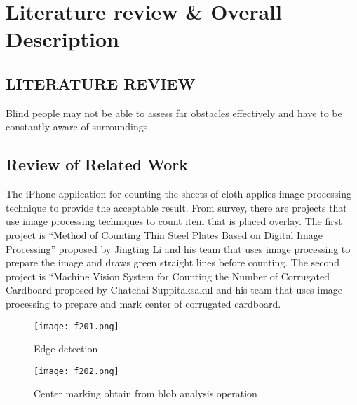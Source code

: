 
\chapter{Literature review & Overall Description} %

\label{Chapter2} %



\section{LITERATURE REVIEW}

Blind people may not be able to assess far obstacles effectively and have to be constantly aware of surroundings.

\section{Review of Related Work}
The iPhone application for counting the sheets of cloth applies image processing technique to provide the acceptable result. From survey, there are projects that use image processing techniques to count item that is placed overlay. The first project is “Method of Counting Thin Steel Plates Based on Digital Image Processing” proposed by Jingting Li and his team\cite{Method} that uses image processing to prepare the image and draws green straight lines before counting. The second project is “Machine Vision System for Counting the Number of Corrugated Cardboard proposed by Chatchai Suppitaksakul and his team \cite{Machine} that uses image processing to prepare and mark center of corrugated cardboard.\\
\begin{figure}[t]
	\centering
	\texttt{[image: f201.png]}
	\caption{Edge detection}
	\label{fig:f201}
\end{figure}
\begin{figure}[t]
	\centering
	\texttt{[image: f202.png]}
	\caption{Center marking obtain from blob analysis operation}
	\label{fig:f202}
\end{figure}


